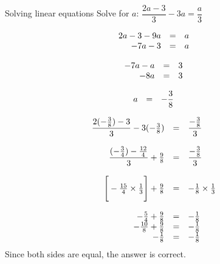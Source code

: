 \begin{wex}
{Solving linear equations}
{Solve for $a$: $\dfrac{2a-3}{3}-3a=\dfrac{a}{3}$}
{

\begin{equation*}
    \begin{array}{cccc}\hfill 2a-3 - 9a &= &a\hfill & \\ 
\hfill -7a - 3 &= &a\hfill & 
    \end{array}
\end{equation*}

\begin{equation*}
    \begin{array}{cccc}\hfill -7a -a &= &3\hfill & \\ 
\hfill -8a &= &3\hfill & \\
    \end{array}
\end{equation*}

\begin{equation*}
    \begin{array}{cccc}\hfill a &= & -\dfrac{3}{8}\hfill & \\ 

    \end{array}
\end{equation*}

\begin{equation*}
    \begin{array}{ccll}\hfill \dfrac{2(-\frac{3}{8}) - 3}{3} - 3(-\frac{3}{8}) &= & \dfrac{-\frac{3}{8}}{3}\hfill & \\ 
\\
      \hfill \dfrac{(-\frac{3}{4}) - \frac{12}{4}}{3} + \frac{9}{8} &= & \dfrac{-\frac{3}{8}}{3}\hfill & \\ 
\\
 \hfill \Bigg[-\frac{15}{4} \times \frac{1}{3}\Bigg] + \frac{9}{8} &= & -\frac{1}{8} \times \frac{1}{3}\hfill & \\ 
\\
 \hfill -\frac{5}{4} + \frac{9}{8} &= & -\frac{1}{8}\hfill & \\ 
 \hfill -\frac{10}{8} + \frac{9}{8} &= & -\frac{1}{8}\hfill & \\ 
 \hfill -\frac{1}{8} &= & -\frac{1}{8}\hfill & 
    \end{array}
\end{equation*}
Since both sides are equal, the answer is correct. 
}
\end{wex}

